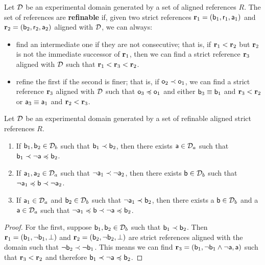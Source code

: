 \documentclass[11pt,letterpaper,fleqn]{memoir} %
\begin{document}
\begin{mathSection}
\begin{defn}
	Let $\edomain$ be an experimental domain generated by a set of aligned references $R$. The set of references are \textbf{refinable} if, given two strict references $\refStmt_1 = ( \stmt[b]_1, \stmt[r]_1, \stmt[a]_1)$ and $\refStmt_2 = ( \stmt[b]_2, \stmt[r]_2, \stmt[a]_2)$ aligned with $\edomain$, we can always:
	\begin{itemize}
		\item find an intermediate one if they are not consecutive; that is, if $\refStmt[r]_1 < \refStmt[r]_2$ but $\refStmt[r]_2$ is not the immediate successor of $\refStmt[r]_1$, then we can find a strict reference $\refStmt_3$ aligned with $\edomain$ such that $\refStmt[r]_1 < \refStmt[r]_3 < \refStmt[r]_2$.
		\item refine the first if the second is finer; that is, if $\stmt[o]_2 \snarrower \stmt[o]_1$, we can find a strict reference $\refStmt_3$ aligned with $\edomain$ such that $\stmt[o]_3 \narrower \stmt[o]_1$ and either $\stmt[b]_3 \equiv \stmt[b]_1$ and $\refStmt_3 < \refStmt_2$ or $\stmt[a]_3 \equiv \stmt[a]_1$ and $\refStmt_2 < \refStmt_3$.
	\end{itemize}
\end{defn}

\begin{prop}\label{3_prop_refinable_order_sequences}
	Let $\edomain$ be an experimental domain generated by a set of refinable aligned strict references $R$.
	\begin{enumerate}
		\item If $\stmt[b]_1, \stmt[b]_2 \in \edomain_b$ such that $\stmt[b]_1 \snarrower \stmt[b]_2$, then there exists $\stmt[a] \in \edomain_a$ such that $\stmt[b]_1 \snarrower \NOT \stmt[a] \narrower \stmt[b]_2$.
		\item If $\stmt[a]_1, \stmt[a]_2 \in \edomain_a$ such that $\NOT \stmt[a]_1 \snarrower \NOT \stmt[a]_2$, then there exists $\stmt[b] \in \edomain_b$ such that $\NOT \stmt[a]_1 \narrower \stmt[b] \snarrower \NOT \stmt[a]_2$.
		\item If $\stmt[a]_1 \in \edomain_a$ and $\stmt[b]_2\in \edomain_b$ such that $\NOT \stmt[a]_1 \snarrower \stmt[b]_2$, then there exists a $\stmt[b] \in \edomain_b$ and a $\stmt[a] \in \edomain_a$ such that $\NOT \stmt[a]_1 \narrower \stmt[b] \snarrower \NOT \stmt[a] \narrower \stmt[b]_2$.
	\end{enumerate}
\end{prop}
\begin{proof}
	For the first, suppose $\stmt[b]_1, \stmt[b]_2 \in \edomain_b$ such that $\stmt[b]_1 \snarrower \stmt[b]_2$. Then $\refStmt_1 = ( \stmt[b]_1, \NOT \stmt[b]_1, \contradiction )$ and  $\refStmt_2 = ( \stmt[b]_2, \NOT \stmt[b]_2, \contradiction)$ are strict references aligned with the domain such that $\NOT \stmt[b]_2 \snarrower \NOT \stmt[b]_1$. This means we can find $\refStmt_3 = ( \stmt[b]_1, \NOT \stmt[b]_1 \AND \NOT \stmt[a], \stmt[a] )$ such that $\refStmt_3 < \refStmt_2$ and therefore $\stmt[b]_1 \snarrower \NOT \stmt[a] \narrower \stmt[b]_2$.
	

\end{proof}
\end{mathSection}
\end{document}

